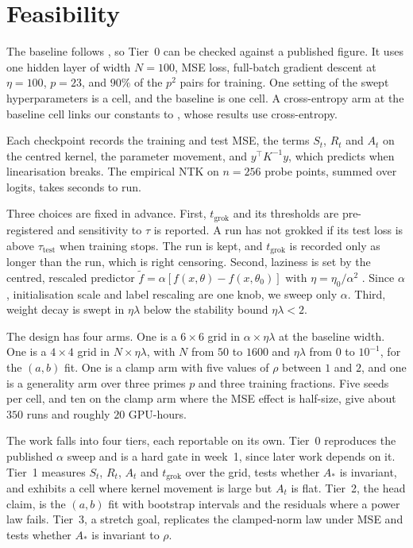\documentclass[a4paper,11pt]{article} %
\newcommand{\tgrok}{t_{\mathrm{grok}}}
\begin{document}
\section{Feasibility}

The baseline follows \citet[App.~8.3, arXiv v3]{kumar2024grokking}, so
Tier~0 can be checked against a published figure. It uses one hidden layer of
width $N=100$, MSE loss, full-batch gradient descent at $\eta=100$, $p=23$, and
$90\%$ of the $p^2$ pairs for training. One setting of the swept
hyperparameters is a cell, and the baseline is one cell. A cross-entropy arm
at the baseline cell links our constants to \citet{truong2026norm}, whose
results use cross-entropy.

Each checkpoint records the training and test MSE, the terms $S_t$, $R_t$ and
$A_t$ on the centred kernel, the parameter movement, and $y^\top K^{-1}y$,
which predicts when linearisation breaks. The empirical NTK
on $n=256$ probe points, summed over logits, takes seconds to run.

Three choices are fixed in advance. First, $\tgrok$ and its thresholds are
pre-registered and sensitivity to $\tau$ is reported. A run has not grokked
if its test loss is above $\tau_{\mathrm{test}}$ when training stops. The run
is kept, and $\tgrok$ is recorded only as longer than the run, which is right
censoring. Second, laziness is set by the centred,
rescaled predictor $\tilde f=\alpha[f(x,\theta)-f(x,\theta_0)]$ with
$\eta=\eta_0/\alpha^2$ \citep{chizat2019lazy, kumar2024grokking}. Since $\alpha$, initialisation
scale and label rescaling are one knob, we sweep only $\alpha$. Third,
weight decay is swept in $\eta\lambda$ below the stability bound
$\eta\lambda<2$.

The design has four arms. One is a $6\times6$ grid in
$\alpha\times\eta\lambda$ at the baseline width. One is a $4\times4$ grid in
$N\times\eta\lambda$, with $N$ from $50$ to $1600$ and $\eta\lambda$ from $0$
to $10^{-1}$, for the $(a,b)$ fit. One is a clamp arm with five values of
$\rho$ between $1$ and $2$, and one is a generality arm over three primes $p$
and three training fractions. Five seeds per cell, and ten on the clamp arm
where the MSE effect is half-size, give about $350$ runs and roughly $20$
GPU-hours.

The work falls into four tiers, each reportable on its own. Tier~0
reproduces the published $\alpha$ sweep and is a hard gate in week~1, since
later work depends on it. Tier~1 measures $S_t$, $R_t$, $A_t$
and $\tgrok$ over the grid, tests whether $A_*$ is invariant, and exhibits a
cell where kernel movement is large but $A_t$ is flat. Tier~2, the head claim,
is the $(a,b)$ fit with bootstrap intervals and the residuals where a power law
fails. Tier~3, a stretch goal, replicates the clamped-norm law under MSE and
tests whether $A_*$ is invariant to $\rho$.
\end{document}
